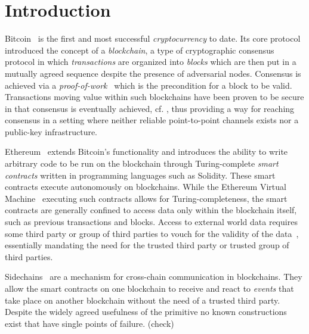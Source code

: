 \section{Introduction}

Bitcoin~\cite{bitcoin} is the first and most successful \emph{cryptocurrency}
to date. Its core protocol introduced the concept of a  \emph{blockchain}, a type of cryptographic consensus protocol in which 
\emph{transactions} are organized into \emph{blocks} which are then put in
 a mutually agreed sequence despite the presence of adversarial nodes. Consensus is achieved via  a  
\emph{proof-of-work}~\cite{C:DwoNao92} which is the precondition for a block to
be valid.  Transactions
moving value within such blockchains have been proven to be secure in that
consensus is eventually achieved, cf.  \cite{EC:GarKiaLeo15,PSS17,C:GarKiaLeo17},
thus providing a way for reaching consensus in a setting   where 
neither reliable point-to-point channels exists nor a public-key infrastructure. 

Ethereum~\cite{buterin} extends Bitcoin's functionality and introduces the
ability to write arbitrary code to be run on the blockchain through
Turing-complete \emph{smart contracts} written in programming languages such as
Solidity. These smart contracts execute autonomously on blockchains.
While the Ethereum Virtual Machine~\cite{wood} executing such contracts allows
for Turing-completeness, the smart contracts are generally confined to access
data only within the blockchain itself, such as previous transactions and
blocks. Access to external world data requires some third party or group of
third parties to vouch for the validity of the data~\cite{CCS:ZCCJS16},
essentially mandating the need for the trusted third party or trusted group of
third parties.

Sidechains~\cite{sidechains} are a mechanism for cross-chain communication in
blockchains. They allow the smart contracts on one blockchain to receive and
react to \textit{events} that take place on another blockchain without the need
of a trusted third party. Despite the widely agreed usefulness of the primitive no known constructions exist that have single points of failure. (check) 

